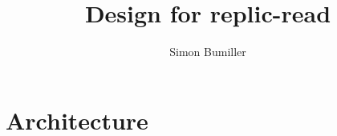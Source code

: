 \documentclass{article}
\title{Design for replic-read}
\author{Simon Bumiller}
\begin{document}
    \maketitle
    \newpage


    \setcounter{tocdepth}{3}

    \tableofcontents
    \newpage
    \listoffigures
    \newpage


    \section{Architecture}\label{sec:architecture}
    
\end{document}
